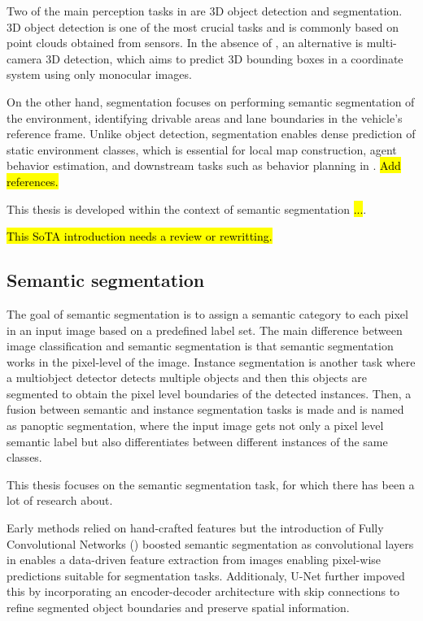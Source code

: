 Two of the main perception tasks in  are 3D object detection and  segmentation. 3D object detection is one of the most crucial tasks and is commonly based on point clouds obtained from  sensors. In the absence of , an alternative is multi-camera 3D detection, which aims to predict 3D bounding boxes in a  coordinate system using only monocular images.

On the other hand,  segmentation focuses on performing semantic segmentation of the environment, identifying drivable areas and lane boundaries in the vehicle's reference frame. Unlike object detection,  segmentation enables dense prediction of static environment classes, which is essential for local map construction, agent behavior estimation, and downstream tasks such as behavior planning in . \hl{Add references.}

This thesis is developed within the context of  semantic segmentation \hl{...}.

\hl{This SoTA introduction needs a review or rewritting.}

\subsection{Semantic segmentation}
The goal of semantic segmentation is to assign a semantic category to each pixel in an input image based on a predefined label set. The main difference between image classification and semantic segmentation is that semantic segmentation works in the pixel-level of the image. Instance segmentation is another task where a multiobject detector detects multiple objects and then this objects are segmented to obtain the pixel level boundaries of the detected instances. Then, a fusion between semantic and instance segmentation tasks is made and is named as panoptic segmentation, where the input image gets not only a pixel level semantic label but also differentiates between different instances of the same classes. 

This thesis focuses on the semantic segmentation task, for which there has been a lot of research about.

Early methods relied on hand-crafted features but the introduction of Fully Convolutional Networks () \cite{FCNs} boosted semantic segmentation as convolutional layers in  enables a data-driven feature extraction from images enabling pixel-wise predictions suitable for segmentation tasks. Additionaly, U-Net \cite{u_net} further impoved this by incorporating an encoder-decoder architecture with skip connections to refine segmented object boundaries and preserve spatial information.

